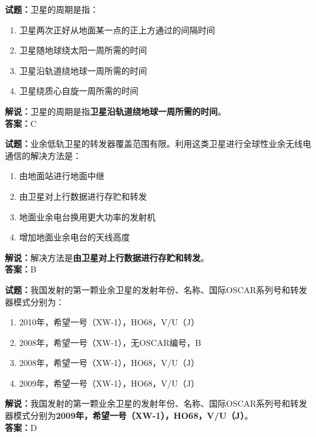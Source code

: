\documentclass{ctexbook}
\begin{document}
\vspace{1em}

\textbf{试题：}卫星的周期是指：
\begin{enumerate}[leftmargin=3em]
  \item 卫星两次正好从地面某一点的正上方通过的间隔时间
  \item 卫星随地球绕太阳一周所需的时间
  \item 卫星沿轨道绕地球一周所需的时间
  \item 卫星绕质心自旋一周所需的时间
\end{enumerate}
\noindent\textbf{解说：}卫星的周期是指\textbf{卫星沿轨道绕地球一周所需的时间}。\\\noindent\textbf{答案：}C

\vspace{1em}

\textbf{试题：}业余低轨卫星的转发器覆盖范围有限。利用这类卫星进行全球性业余无线电通信的解决方法是：
\begin{enumerate}[leftmargin=3em]
  \item 由地面站进行地面中继
  \item 由卫星对上行数据进行存贮和转发
  \item 地面业余电台换用更大功率的发射机
  \item 增加地面业余电台的天线高度
\end{enumerate}
\noindent\textbf{解说：}解决方法是\textbf{由卫星对上行数据进行存贮和转发}。\\\noindent\textbf{答案：}B

\vspace{1em}

\textbf{试题：}我国发射的第一颗业余卫星的发射年份、名称、国际OSCAR系列号和转发器模式分别为：
\begin{enumerate}[leftmargin=3em]
  \item 2010年，希望一号（XW-1），HO68，V/U（J）
  \item 2008年，希望一号（XW-1），无OSCAR编号，B
  \item 2008年，希望一号（XW-1），HO68，V/U（J）
  \item 2009年，希望一号（XW-1），HO68，V/U（J）
\end{enumerate}
\noindent\textbf{解说：}我国发射的第一颗业余卫星的发射年份、名称、国际OSCAR系列号和转发器模式分别为\textbf{2009年，希望一号（XW-1），HO68，V/U（J）}。\\\noindent\textbf{答案：}D

\vspace{1em}
\end{document}
